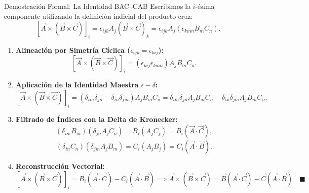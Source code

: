 \documentclass[10pt,aspectratio=169]{beamer}
\begin{document}
\begin{frame}{Demostración Formal: La Identidad BAC--CAB}
  \footnotesize
  Escribimos la $i$-ésima componente utilizando la definición indicial del producto cruz:
  \[
  [\vec{A} \times (\vec{B} \times \vec{C})]_i = \epsilon_{ijk} A_j (\vec{B}\times\vec{C})_k = \epsilon_{ijk} A_j (\epsilon_{kmn} B_m C_n).
  \]
  \begin{enumerate}\itemsep3pt
    \item \textbf{Alineación por Simetría Cíclica ($\epsilon_{ijk} = \epsilon_{kij}$):}
    \[
    [\vec{A} \times (\vec{B} \times \vec{C})]_i = (\epsilon_{kij}\epsilon_{kmn}) A_j B_m C_n.
    \]
    \item \textbf{Aplicación de la Identidad Maestra $\epsilon-\delta$:}
    \[
    [\vec{A} \times (\vec{B} \times \vec{C})]_i = (\delta_{im}\delta_{jn} - \delta_{in}\delta_{jm}) A_j B_m C_n = \delta_{im}\delta_{jn} A_j B_m C_n - \delta_{in}\delta_{jm} A_j B_m C_n.
    \]
    \item \textbf{Filtrado de Índices con la Delta de Kronecker:}
    \[
    (\delta_{im} B_m)(\delta_{jn} A_j C_n) = B_i (A_j C_j) = B_i (\vec{A}\cdot\vec{C}),
    \]
    \[
    (\delta_{in} C_n)(\delta_{jm} A_j B_m) = C_i (A_j B_j) = C_i (\vec{A}\cdot\vec{B}).
    \]
    \item \textbf{Reconstrucción Vectorial:}
    \[
    \boxed{[\vec{A} \times (\vec{B} \times \vec{C})]_i = B_i(\vec{A}\cdot\vec{C}) - C_i(\vec{A}\cdot\vec{B})} \implies \vec{A}\times(\vec{B}\times\vec{C}) = \vec{B}(\vec{A}\cdot\vec{C}) - \vec{C}(\vec{A}\cdot\vec{B}) \quad \blacksquare
    \]
  \end{enumerate}
\end{frame}
\end{document}
